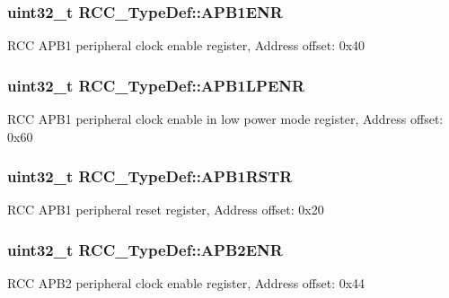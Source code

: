 \subsubsection[{\texorpdfstring{A\+P\+B1\+E\+NR}{APB1ENR}}]{ uint32\+\_\+t R\+C\+C\+\_\+\+Type\+Def\+::\+A\+P\+B1\+E\+NR}\hypertarget{struct_r_c_c___type_def_aec7622ba90341c9faf843d9ee54a759f}{}\label{struct_r_c_c___type_def_aec7622ba90341c9faf843d9ee54a759f}
R\+CC A\+P\+B1 peripheral clock enable register, Address offset\+: 0x40 
\subsubsection[{\texorpdfstring{A\+P\+B1\+L\+P\+E\+NR}{APB1LPENR}}]{ uint32\+\_\+t R\+C\+C\+\_\+\+Type\+Def\+::\+A\+P\+B1\+L\+P\+E\+NR}\hypertarget{struct_r_c_c___type_def_a5c8e710c40b642dcbf296201a7ecb2da}{}\label{struct_r_c_c___type_def_a5c8e710c40b642dcbf296201a7ecb2da}
R\+CC A\+P\+B1 peripheral clock enable in low power mode register, Address offset\+: 0x60 
\subsubsection[{\texorpdfstring{A\+P\+B1\+R\+S\+TR}{APB1RSTR}}]{ uint32\+\_\+t R\+C\+C\+\_\+\+Type\+Def\+::\+A\+P\+B1\+R\+S\+TR}\hypertarget{struct_r_c_c___type_def_a600f4d6d592f43edb2fc653c5cba023a}{}\label{struct_r_c_c___type_def_a600f4d6d592f43edb2fc653c5cba023a}
R\+CC A\+P\+B1 peripheral reset register, Address offset\+: 0x20 
\subsubsection[{\texorpdfstring{A\+P\+B2\+E\+NR}{APB2ENR}}]{ uint32\+\_\+t R\+C\+C\+\_\+\+Type\+Def\+::\+A\+P\+B2\+E\+NR}\hypertarget{struct_r_c_c___type_def_a619b4c22f630a269dfd0c331f90f6868}{}\label{struct_r_c_c___type_def_a619b4c22f630a269dfd0c331f90f6868}
R\+CC A\+P\+B2 peripheral clock enable register, Address offset\+: 0x44 
